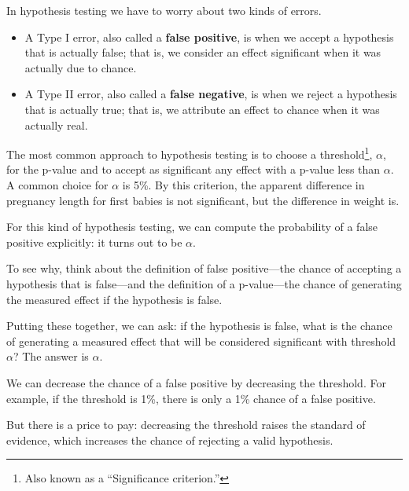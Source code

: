 \documentclass[12pt]{book}
\begin{document}
In hypothesis testing we have to worry about two kinds of errors.


\begin{itemize}

\item A Type I error, also called a {\bf false positive}, is when we
  accept a hypothesis that is actually false; that is, we consider an
  effect significant when it was actually due to chance.

\item A Type II error, also called a {\bf false negative}, is when we
  reject a hypothesis that is actually true; that is, we attribute an
  effect to chance when it was actually real.

\end{itemize}

The most common approach to hypothesis testing is to choose a
threshold\footnote{Also known as a ``Significance criterion.''},
$\alpha$, for the p-value and to accept as significant any effect with
a p-value less than $\alpha$.  A common choice for $\alpha$ is 5\%.
By this criterion, the apparent difference in pregnancy length for
first babies is not significant, but the difference in weight is.



For this kind of hypothesis testing, we can compute the probability of
a false positive explicitly: it turns out to be $\alpha$.

To see why, think about the definition of false positive---the chance
of accepting a hypothesis that is false---and the definition of a
p-value---the chance of generating the measured effect if the
hypothesis is false.

Putting these together, we can ask: if the hypothesis is false,
what is the chance of generating a measured effect that will be
considered significant with threshold $\alpha$?  The answer is
$\alpha$.

We can decrease the chance of a false positive by decreasing the
threshold.  For example, if the threshold is 1\%, there is only a 1\%
chance of a false positive.

But there is a price to pay: decreasing the threshold raises the
standard of evidence, which increases the chance of rejecting
a valid hypothesis.
\end{document}
